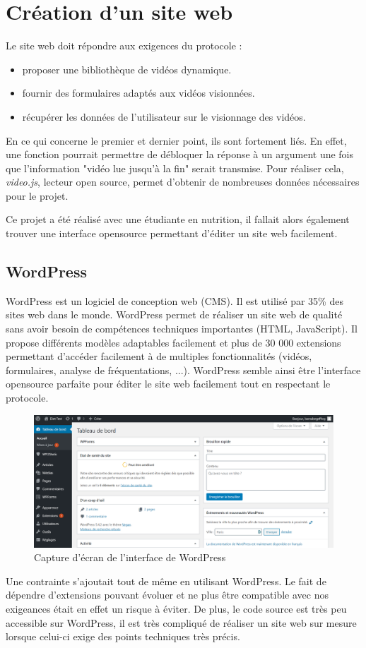 \section{Création d'un site web}
Le site web doit répondre aux exigences du protocole : 
\begin{itemize}
    \item proposer une bibliothèque de vidéos dynamique.
    \item fournir des formulaires adaptés aux vidéos visionnées.
    \item récupérer les données de l'utilisateur sur le visionnage des vidéos.
\end{itemize}
En ce qui concerne le premier et dernier point, ils sont fortement liés. En effet, une fonction pourrait permettre de débloquer la réponse à un argument une fois que l'information "vidéo lue jusqu'à la fin" serait transmise. Pour réaliser cela, \textit{video.js}, lecteur open source, permet d'obtenir de nombreuses données nécessaires pour le projet.

Ce projet a été réalisé avec une étudiante en nutrition, il fallait alors également trouver une interface opensource permettant d'éditer un site web facilement.

\subsection{WordPress}
WordPress est un logiciel de conception web (CMS). Il est utilisé par 35\% des sites web dans le monde. WordPress permet de réaliser un site web de qualité sans avoir besoin de compétences techniques importantes (HTML, JavaScript). Il propose différents modèles adaptables facilement et plus de 30 000 extensions permettant d'accéder facilement à de multiples fonctionnalités (vidéos, formulaires, analyse de fréquentations, ...). WordPress semble ainsi être l'interface opensource parfaite pour éditer le site web facilement tout en respectant le protocole.

\begin{figure}[!ht]
    \begin{center}\includegraphics[width=\textwidth]{assets/wp.PNG}
    \end{center}
    \caption{Capture d'écran de l'interface de WordPress}
\end{figure}
Une contrainte s'ajoutait tout de même en utilisant WordPress. Le fait de dépendre d'extensions pouvant évoluer et ne plus être compatible avec nos exigeances était en effet un risque à éviter. De plus, le code source est très peu accessible sur WordPress, il est très compliqué de réaliser un site web sur mesure lorsque celui-ci exige des points techniques très précis.

